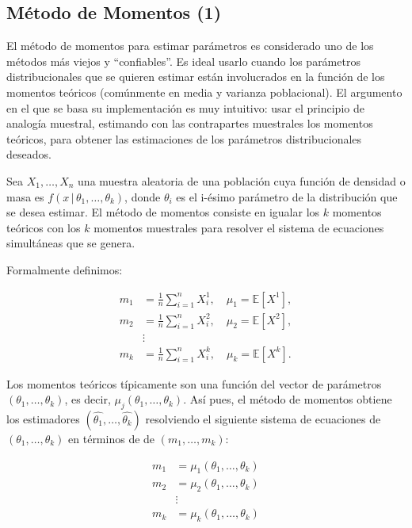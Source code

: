 \documentclass[9pt,twocolumn,twoside,]{pnas-new}
\begin{document}
\hypertarget{muxe9todo-de-momentos-casella2021statistical}{%
\subsection{Método de Momentos
(1)}\label{muxe9todo-de-momentos-casella2021statistical}}

El método de momentos para estimar parámetros es considerado uno de los
métodos más viejos y ``confiables''. Es ideal usarlo cuando los
parámetros distribucionales que se quieren estimar están involucrados en
la función de los momentos teóricos (comúnmente en media y varianza
poblacional). El argumento en el que se basa su implementación es muy
intuitivo: usar el principio de analogía muestral, estimando con las
contrapartes muestrales los momentos teóricos, para obtener las
estimaciones de los parámetros distribucionales deseados.

Sea \(X_1, \ldots , X_n\) una muestra aleatoria de una población cuya
función de densidad o masa es
\(f(x \, | \, \theta_1, \ldots , \theta_k)\), donde \(\theta_i\) es el
i-ésimo parámetro de la distribución que se desea estimar. El método de
momentos consiste en igualar los \(k\) momentos teóricos con los \(k\)
momentos muestrales para resolver el sistema de ecuaciones simultáneas
que se genera.

Formalmente definimos:

\begin{equation*}
\begin{aligned}
m_{1} &=\frac{1}{n} \sum_{i=1}^{n} X_{i}^{1}, \quad \mu_{1}=\mathbb{E}[ X^{1}], \\
m_{2} &=\frac{1}{n} \sum_{i=1}^{n} X_{i}^{2}, \quad \mu_{2}=\mathbb{E}[ X^{2}], \\
& \vdots \\
m_{k} &=\frac{1}{n} \sum_{i=1}^{n} X_{i}^{k}, \quad \mu_{k}=\mathbb{E}[ X^{k}] .
\end{aligned}
\end{equation*}

Los momentos teóricos típicamente son una función del vector de
parámetros \((\theta_1, \ldots, \theta_k)\), es decir,
\(\mu_j(\theta_1, \ldots, \theta_k)\). Así pues, el método de momentos
obtiene los estimadores \((\hat{\theta_1}, \ldots, \hat{\theta_k})\)
resolviendo el siguiente sistema de ecuaciones de
\((\theta_1, \ldots, \theta_k)\) en términos de de
\((m_1, \ldots, m_k)\):

\begin{equation*}
    \begin{aligned}
m_{1} &=\mu_{1}\left(\theta_{1}, \ldots, \theta_{k}\right) \\
m_{2} &=\mu_{2}\left(\theta_{1}, \ldots, \theta_{k}\right) \\
& \vdots \\
m_{k} &=\mu_{k}\left(\theta_{1}, \ldots, \theta_{k}\right)
\end{aligned}
\end{equation*}
\end{document}
